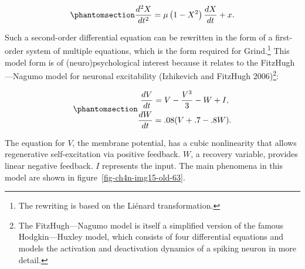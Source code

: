 \documentclass[
  a4paper,
  DIV=11,
  numbers=noendperiod,
  oneside]{scrreprt}
\begin{document}
\begin{equation}\phantomsection\label{eq-ch4n-15-old-35}{
\frac{d^{2}X}{dt^{2}} = \mu\left( 1 - X^{2} \right)\frac{dX}{dt} + x.
}\end{equation}

Such a second-order differential equation can be rewritten in the form
of a first-order system of multiple equations, which is the form
required for Grind.\footnote{The rewriting is based on the Liénard
  transformation.} This model form is of (neuro)psychological interest
because it relates to the FitzHugh---Nagumo model for neuronal
excitability (Izhikevich and FitzHugh 2006)\footnote{The
  FitzHugh---Nagumo model is itself a simplified version of the famous
  Hodgkin---Huxley model, which consists of four differential equations
  and models the activation and deactivation dynamics of a spiking
  neuron in more detail.}:

\begin{equation}\phantomsection\label{eq-ch4n-16-old-36}{
\begin{gathered}
\frac{dV}{dt} = V - \frac{V^{3}}{3} - W + I, \\ 
\frac{dW}{dt} = .08(V + .7 - .8W).
\end{gathered}}\end{equation}

The equation for \(V\), the membrane potential, has a cubic nonlinearity
that allows regenerative self-excitation via positive feedback. \(W\), a
recovery variable, provides linear negative feedback. \(I\) represents
the input. The main phenomena in this model are shown in
figure~\ref{fig-ch4n-img15-old-63}.
\end{document}
